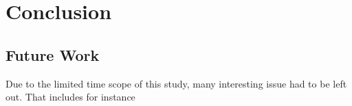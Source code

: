 \chapter{Conclusion}
\label{chap:conclusion}



\section{Future Work}
\label{sec:future}



Due to the limited time scope of this study, many interesting issue had to be left out. That includes for instance